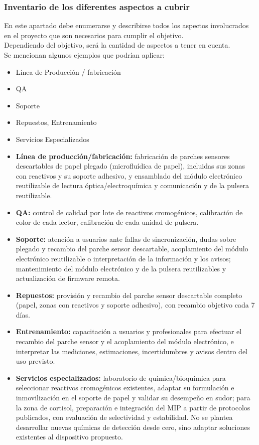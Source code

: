 \subsubsection{Inventario de los diferentes aspectos a cubrir}
{\consigna
En este apartado debe enumerarse y describirse todos los aspectos involucrados en el proyecto que son necesarios para cumplir el objetivo.\\
Dependiendo del objetivo, será la cantidad de aspectos a tener en cuenta.\\
Se mencionan algunos ejemplos que podrían aplicar:

\begin{itemize}
\setlength{\itemsep}{3 pt}
    \item Línea de Producción / fabricación
    \item QA
    \item Soporte
    \item Repuestos, Entrenamiento
    \item Servicios Especializados
\end{itemize}
}


\begin{itemize}
    \item \textbf{Línea de producción/fabricación:} fabricación de parches sensores descartables de papel plegado (microfluídica de papel), incluidas sus zonas con reactivos y su soporte adhesivo, y ensamblado del módulo electrónico reutilizable de lectura óptica/electroquímica y comunicación y de la pulsera reutilizable.
    \item \textbf{QA:} control de calidad por lote de reactivos cromogénicos, calibración de color de cada lector, calibración de cada unidad de pulsera.
    \item \textbf{Soporte:} atención a usuarios ante fallas de sincronización, dudas sobre plegado y recambio del parche sensor descartable, acoplamiento del módulo electrónico reutilizable o interpretación de la información y los avisos; mantenimiento del módulo electrónico y de la pulsera reutilizables y actualización de firmware remota.
    \item \textbf{Repuestos:} provisión y recambio del parche sensor descartable completo (papel, zonas con reactivos y soporte adhesivo), con recambio objetivo cada 7 días.
    \item \textbf{Entrenamiento:} capacitación a usuarios y profesionales para efectuar el recambio del parche sensor y el acoplamiento del módulo electrónico, e interpretar las mediciones, estimaciones, incertidumbres y avisos dentro del uso previsto.
    \item \textbf{Servicios especializados:} laboratorio de química/bioquímica para seleccionar reactivos cromogénicos existentes, adaptar su formulación e inmovilización en el soporte de papel y validar su desempeño en sudor; para la zona de cortisol, preparación e integración del MIP a partir de protocolos publicados, con evaluación de selectividad y estabilidad. No se plantea desarrollar nuevas químicas de detección desde cero, sino adaptar soluciones existentes al dispositivo propuesto.
\end{itemize}

